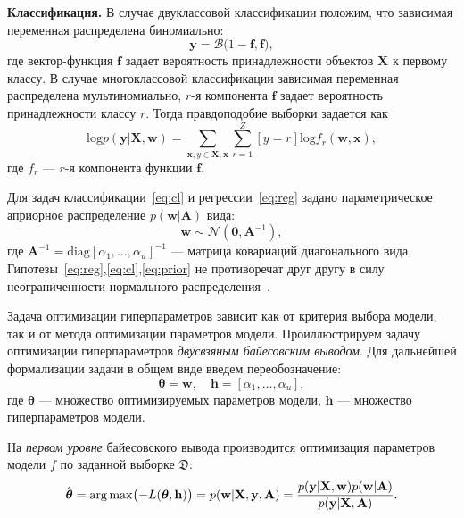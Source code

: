 \textbf{Классификация. }
В случае двуклассовой классификации положим, что зависимая переменная распределена биномиально:
\begin{equation}
\label{eq:cl}
	\mathbf{y} = \mathcal{B}\bigl(1-\mathbf{f}, \mathbf{f}\bigr),
\end{equation}
где вектор-функция $\mathbf{f}$ задает вероятность принадлежности объектов $\mathbf{X}$ к первому классу.
В случае многоклассовой классификации зависимая переменная распределена мультиномиально, $r$-я компонента $\mathbf{f}$ задает вероятность принадлежности классу $r$.
Тогда правдоподобие выборки задается как 
\[
	\text{log}p(\mathbf{y}|\mathbf{X}, \mathbf{w}) = \sum_{\mathbf{x}, y \in \mathbf{X}, \mathbf{x}} \sum_{r=1}^Z[y=r] \text{log}{f}_r(\mathbf{w}, \mathbf{x}),
\] 
где ${f}_r$ --- $r$-я компонента функции $\mathbf{f}$.

Для задач классификации~\eqref{eq:cl} и регрессии~\eqref{eq:reg} задано параметрическое априорное распределение $p(\mathbf{w}|\mathbf{A})$ вида:
\begin{equation}
\label{eq:prior}
	\mathbf{w} \sim \mathcal{N}(\mathbf{0}, \mathbf{A}^{-1}),
\end{equation}
где $\mathbf{A}^{-1} = \text{diag}[\alpha_1, \dots, \alpha_u]^{-1}$ --- матрица ковариаций диагонального вида. Гипотезы~\eqref{eq:reg},\eqref{eq:cl},\eqref{eq:prior} не противоречат друг другу в силу неограниченности нормального распределения~\cite{bayes_constr}. 

Задача оптимизации гиперпараметров зависит как от критерия выбора модели, так и от метода оптимизации параметров модели.
Проиллюстрируем задачу оптимизации гиперпараметров \textit{двусвзяным байесовским выводом}. Для дальнейшей формализации задачи в общем виде введем переобозначение:
\begin{equation}
\label{eq:bayes0}
	\boldsymbol{\theta} = \mathbf{w}, \quad \mathbf{h} = [\alpha_1, \dots, \alpha_u],	
\end{equation}
где $\boldsymbol{\theta}$ --- множество оптимизируемых параметров модели, $\mathbf{h}$ --- множество гиперпараметров модели.

На \textit{первом уровне} байесовского вывода производится оптимизация параметров модели $f$ по заданной выборке $\mathfrak{D}$:
\begin{equation}
\label{eq:bayes1}
\hat{\boldsymbol{\theta}} = \operatorname*{arg\,max} \bigl(-L(\boldsymbol{\theta}, \mathbf{h})\bigr) = p(\mathbf{w}|\mathbf{X}, \mathbf{y}, \mathbf{A}) = \frac{p(\mathbf{y}|\mathbf{X},\mathbf{w})p(\mathbf{w}|\mathbf{A})}{p(\mathbf{y}|\mathbf{X},\mathbf{A})}.
\end{equation}

